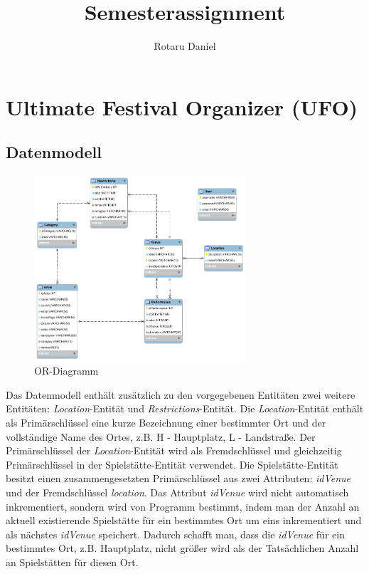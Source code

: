 \documentclass[12pt, a4paper]{article}
\title{Semesterassignment} \let\Title\@title
\author{Rotaru Daniel} \let\Author\@author
\begin{document}


\section{Ultimate Festival Organizer (UFO)}

\subsection{Datenmodell}

\begin{figure}[h] 	
	\centering
		\includegraphics[width=0.7\textwidth]{DbDiagramm.png}
	\caption{OR-Diagramm}
\end{figure}

Das Datenmodell enthält zusätzlich zu den vorgegebenen Entitäten zwei weitere Entitäten: \textit{Location}-Entität und \textit{Restrictions}-Entität. Die \textit{Location}-Entität enthält als Primärschlüssel eine kurze Bezeichnung einer bestimmter Ort und der vollständige Name des Ortes, z.B. H - Hauptplatz, L - Landstraße. Der Primärschlüssel der \textit{Location}-Entität wird als Fremdschlüssel und gleichzeitig Primärschlüssel in der Spielstätte-Entität verwendet. Die Spielstätte-Entität besitzt einen zusammengesetzten Primärschlüssel aus zwei Attributen: \textit{idVenue} und der Fremdschlüssel \textit{location}. Das Attribut \textit{idVenue} wird nicht automatisch inkrementiert, sondern wird von Programm bestimmt, indem man der Anzahl an aktuell existierende Spielstätte für ein bestimmtes Ort um eins inkrementiert und als nächstes \textit{idVenue} speichert. Dadurch schafft man, dass die \textit{idVenue} für ein bestimmtes Ort, z.B. Hauptplatz, nicht größer wird als der Tatsächlichen Anzahl an Spielstätten für diesen Ort.
\end{document}
